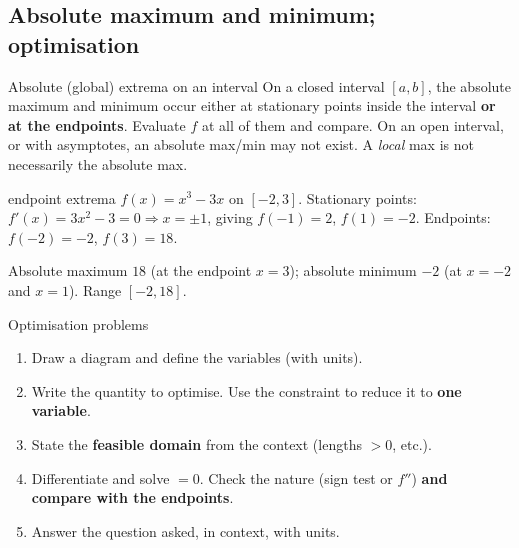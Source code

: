 \subsection{Absolute maximum and minimum; optimisation}
\label{sec:opt}

\begin{keyres}{Absolute (global) extrema on an interval}
On a closed interval $[a,b]$, the absolute maximum and minimum occur either at stationary points inside the interval \textbf{or at the endpoints}. Evaluate $f$ at all of them and compare. On an open interval, or with asymptotes, an absolute max/min may not exist. A \emph{local} max is not necessarily the absolute max.
\end{keyres}

\begin{example}{endpoint extrema \byhand}
$f(x)=x^3-3x$ on $[-2,3]$. Stationary points: $f'(x)=3x^2-3=0\Rightarrow x=\pm1$, giving $f(-1)=2$, $f(1)=-2$. Endpoints: $f(-2)=-2$, $f(3)=18$.\par
Absolute maximum $18$ (at the endpoint $x=3$); absolute minimum $-2$ (at $x=-2$ and $x=1$). Range $[-2,18]$.
\end{example}

\begin{method}{Optimisation problems}
\begin{enumerate}
  \item Draw a diagram and define the variables (with units).
  \item Write the quantity to optimise. Use the constraint to reduce it to \textbf{one variable}.
  \item State the \textbf{feasible domain} from the context (lengths $>0$, etc.).
  \item Differentiate and solve $=0$. Check the nature (sign test or $f''$) \textbf{and compare with the endpoints}.
  \item Answer the question asked, in context, with units.
\end{enumerate}
\end{method}

